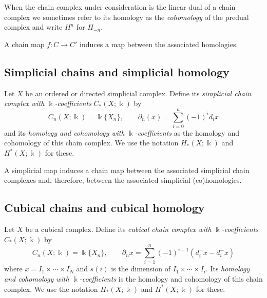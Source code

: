 \documentclass{amsart}
\begin{document}
	When the chain complex under consideration is the linear dual of a chain complex we sometimes refer to its homology as the \textit{cohomology} of the predual complex and write $H^n$ for $H_{-n}$.
	
	A chain map $f : C \to C'$ induces a map between the associated homologies.
	
	\subsection*{Simplicial chains and simplicial homology} \label{simplicial_chains_and_simplicial_homology}
	
	Let $X$ be an ordered or directed simplicial complex. Define its \textit{simplicial chain complex with} $\Bbbk$\textit{-coefficients} $C_*(X; \Bbbk)$ by 
	\begin{equation*}
	C_n(X; \Bbbk) = \Bbbk\{X_n\}, \qquad \partial_n(x) = \sum_{i=0}^{n} (-1)^i d_ix
	\end{equation*}
	and its \textit{homology and cohomology with} $\Bbbk$\textit{-coefficients} as the 
	homology and cohomology of this chain complex. We use the notation $H_*(X; \Bbbk)$ and $H^*(X; \Bbbk)$ for these.
	
	A 
	simplicial map induces a 
	chain map between the associated simplicial chain complexes and, therefore, between the associated simplicial (co)homologies.
	
	\subsection*{Cubical chains and cubical homology} \label{cubical_chains_and_cubical_homology}
	
	Let $X$ be a cubical complex. Define its \textit{cubical chain complex with} $\Bbbk$\textit{-coefficients} $C_*(X; \Bbbk)$ by 
	\begin{equation*}
	C_n(X; \Bbbk) = \Bbbk\{X_n\}, \qquad \partial_n x = \sum_{i = 1}^{n} (-1)^{i-1}(d^+_i x - d^-_i x)
	\end{equation*}
	where $x = I_1 \times \cdots \times I_N$ and $s(i)$ is the dimension of $I_1 \times \cdots \times I_i$.
	Its \textit{homology and cohomology with} $\Bbbk$\textit{-coefficients} is the 
	homology and cohomology of this chain complex. We use the notation $H_*(X; \Bbbk)$ and $H^*(X; \Bbbk)$ for these.
	
\end{document}
